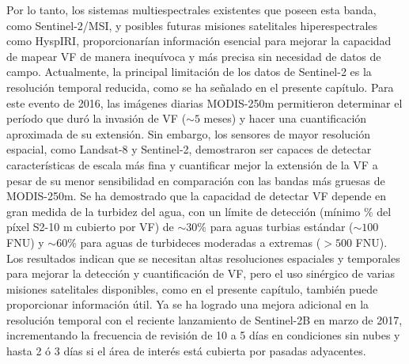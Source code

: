     Por lo tanto, los sistemas multiespectrales existentes que poseen esta banda, como Sentinel-2/MSI, y posibles futuras misiones satelitales hiperespectrales como HyspIRI, proporcionarían información esencial para mejorar la capacidad de mapear VF de manera inequívoca y más precisa sin necesidad de datos de campo. Actualmente, la principal limitación de los datos de Sentinel-2 es la resolución temporal reducida, como se ha señalado en el presente capítulo. Para este evento de 2016, las imágenes diarias MODIS-250m permitieron determinar el período que duró la invasión de VF ($\sim 5$ meses) y hacer una cuantificación aproximada de su extensión. Sin embargo, los sensores de mayor resolución espacial, como Landsat-8 y Sentinel-2, demostraron ser capaces de detectar características de escala más fina y cuantificar mejor la extensión de la VF a pesar de su menor sensibilidad en comparación con las bandas más gruesas de MODIS-250m. Se ha demostrado que la capacidad de detectar VF depende en gran medida de la turbidez del agua, con un límite de detección (mínimo $\%$ del píxel S2-10 m cubierto por VF) de $\sim 30 \%$ para aguas turbias estándar ($\sim 100$ FNU) y $\sim 60 \%$ para aguas de turbideces moderadas a extremas ($> 500$ FNU). Los resultados indican que se necesitan altas resoluciones espaciales y temporales para mejorar la detección y cuantificación de VF, pero el uso sinérgico de varias misiones satelitales disponibles, como en el presente capítulo, también puede proporcionar información útil. Ya se ha logrado una mejora adicional en la resolución temporal con el reciente lanzamiento de Sentinel-2B en marzo de 2017, incrementando la frecuencia de revisión de 10 a 5 días en condiciones sin nubes y hasta 2 ó 3 días si el área de interés está cubierta por pasadas adyacentes.
